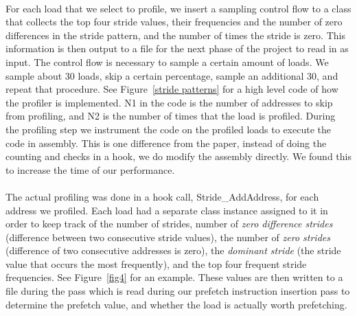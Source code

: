 \documentclass[11pt]{article}
\begin{document}
  \\For each load that we select to profile, we insert a sampling control flow to a class that collects the top four stride values, their frequencies and the number of zero differences in the stride pattern, and the number of times the stride is zero. This information is then output to a file for the next phase of the project to read in as input. The control flow is necessary to sample a certain amount of loads. We sample about 30 loads, skip a certain percentage, sample an additional 30, and repeat that procedure. See Figure~\ref{stride patterns} for a high level code of how the profiler is implemented. N1 in the code is the number of addresses to skip from profiling, and N2 is the number of times that the load is profiled. During the profiling step we instrument the code on the profiled loads to execute the code in assembly. This is one difference from the paper, instead of doing the counting and checks in a hook, we do modify the assembly directly. We found this to increase the time of our performance.
  \\\\The actual profiling was done in a hook call, Stride\_AddAddress, for each address we profiled. Each load had a separate class instance assigned to it in order to keep track of the number of strides, number of \textit{zero difference strides} (difference between two consecutive stride values), the number of \textit{zero strides} (difference of two consecutive addresses is zero), the \textit{dominant stride} (the stride value that occurs the most frequently), and the top four
  frequent stride frequencies. See Figure~\ref{fig4} for an example.
  These values are then written to a file during the pass which is read during our prefetch instruction insertion pass to determine the prefetch value, and whether the load is actually worth prefetching.
\end{document}
